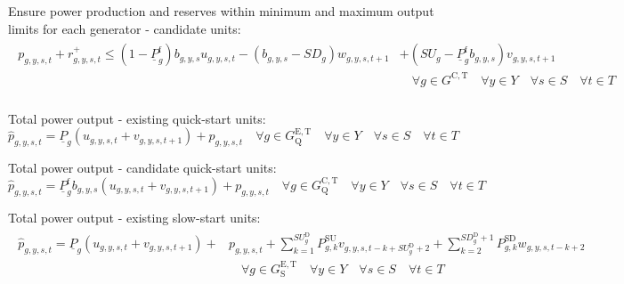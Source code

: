 \documentclass{article}
\newcommand{\sGeneratorsCandidateThermal}{G^{\mathrm{C,T}}}
\newcommand{\sYears}{Y}
\newcommand{\sScenarios}{S}
\newcommand{\sIntervals}{T}
\newcommand{\sGeneratorsExistingThermalQuickStart}{G^{\mathrm{E,T}}_\mathrm{Q}}
\newcommand{\sGeneratorsCandidateThermalQuickStart}{G^{\mathrm{C,T}}_\mathrm{Q}}
\newcommand{\sGeneratorsExistingThermalSlowStart}{G^{\mathrm{E,T}}_\mathrm{S}}
\newcommand{\iGenerator}{g}
\newcommand{\iYear}{y}
\newcommand{\iScenario}{s}
\newcommand{\iInterval}{t}
\newcommand{\iIntervalAlias}{k}
\newcommand{\cPowerOutputMin}[1][\iGenerator]{\underline{P}_{#1}}
\newcommand{\cStartupDuration}[1][\iGenerator]{SU_{#1}^{\mathrm{D}}}
\newcommand{\cStartupTrajectory}[1][\iGenerator,\iIntervalAlias]{P^{\mathrm{SU}}_{#1}}
\newcommand{\cShutdownDuration}[1][\iGenerator]{SD_{#1}^{\mathrm{D}}}
\newcommand{\cShutdownTrajectory}[1][\iGenerator,\iIntervalAlias]{P^{\mathrm{SD}}_{#1}}
\newcommand{\cPowerOutputMinProportion}{\cPowerOutputMin^{\mathrm{f}}}
\newcommand{\cRampRateStartup}[1][\iGenerator]{SU_{#1}}
\newcommand{\cRampRateShutdown}[1][\iGenerator]{SD_{#1}}
\newcommand{\vStartupIndicator}[1][\iGenerator,\iYear,\iScenario,\iInterval]{v_{#1}}
\newcommand{\vShutdownIndicator}[1][\iGenerator,\iYear,\iScenario,\iInterval]{w_{#1}}
\newcommand{\vReserveUp}[1][\iGenerator,\iYear,\iScenario,\iInterval]{r^{+}_{#1}}
\newcommand{\vOnIndicator}[1][\iGenerator,\iYear,\iScenario,\iInterval]{u_{#1}}
\newcommand{\vPower}[1][\iGenerator,\iYear,\iScenario,\iInterval]{p_{#1}}
\newcommand{\vPowerTotal}[1][\iGenerator,\iYear,\iScenario,\iInterval]{\hat{p}_{#1}}
\newcommand{\vInstalledCapacityTotalScenario}[1][\iGenerator,\iYear,\iScenario]{b_{#1}}
\begin{document}
Ensure power production and reserves within minimum and maximum output limits for each generator - candidate units:
\begin{align}
	\begin{split}
		\vPower + \vReserveUp \leq \left(1 - \cPowerOutputMinProportion\right) \vInstalledCapacityTotalScenario \vOnIndicator - \left(\vInstalledCapacityTotalScenario -\cRampRateShutdown \right) \vShutdownIndicator[\iGenerator,\iYear,\iScenario,\iInterval+1] & + \left(\cRampRateStartup - \cPowerOutputMinProportion\vInstalledCapacityTotalScenario \right)\vStartupIndicator[\iGenerator,\iYear,\iScenario,\iInterval+1]\\
		& \quad \forall \iGenerator \in \sGeneratorsCandidateThermal \quad \forall \iYear \in \sYears \quad \forall \iScenario \in \sScenarios \quad \forall \iInterval \in \sIntervals\\
		\label{eqn: power output within limits - candidate}
	\end{split}
\end{align}

Total power output - existing quick-start units:
\begin{equation}
\vPowerTotal = \cPowerOutputMin \left(\vOnIndicator + \vStartupIndicator[\iGenerator,\iYear,\iScenario,\iInterval+1]\right) + \vPower \quad \forall \iGenerator \in \sGeneratorsExistingThermalQuickStart \quad \forall \iYear \in \sYears \quad \forall \iScenario \in \sScenarios \quad \forall \iInterval \in \sIntervals
\end{equation}

Total power output - candidate quick-start units:
\begin{equation}
\vPowerTotal = \cPowerOutputMinProportion \vInstalledCapacityTotalScenario \left(\vOnIndicator + \vStartupIndicator[\iGenerator,\iYear,\iScenario,\iInterval+1]\right) + \vPower \quad \forall \iGenerator \in \sGeneratorsCandidateThermalQuickStart \quad \forall \iYear \in \sYears \quad \forall \iScenario \in \sScenarios \quad \forall \iInterval \in \sIntervals
\label{eqn: total power - quick start}
\end{equation}

Total power output - existing slow-start units:
\begin{align}
\begin{split}
\vPowerTotal =  \cPowerOutputMin \left(\vOnIndicator + \vStartupIndicator[\iGenerator,\iYear,\iScenario,\iInterval+1]\right) + & \vPower + \sum\limits_{\iIntervalAlias=1}^{\cStartupDuration} \cStartupTrajectory \vStartupIndicator[\iGenerator,\iYear,\iScenario,\iInterval-\iIntervalAlias+\cStartupDuration+2] + \sum\limits_{\iIntervalAlias=2}^{\cShutdownDuration + 1} \cShutdownTrajectory \vShutdownIndicator[\iGenerator,\iYear,\iScenario,\iInterval-\iIntervalAlias+2]\\
& \quad \forall \iGenerator \in \sGeneratorsExistingThermalSlowStart \quad \forall \iYear \in \sYears \quad \forall \iScenario \in \sScenarios \quad \forall \iInterval \in \sIntervals
\end{split}
\end{align}
\end{document}
